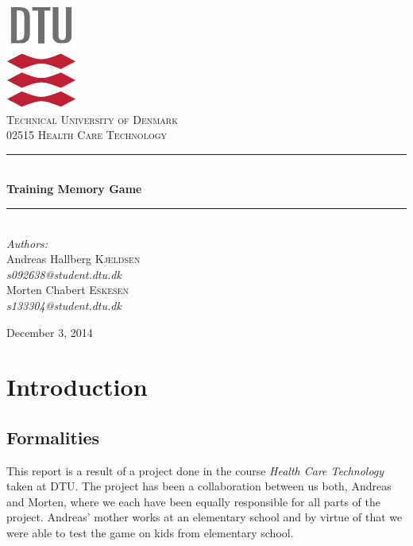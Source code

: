 \documentclass[11pt]{report}
\newcommand{\HRule}{\rule{\linewidth}{0.5mm}}
\begin{document}
\begin{titlepage}
\begin{center}

\includegraphics[scale=2.0]{../GFX/dtu_logo.pdf}\\[1cm]

\textsc{\LARGE Technical University of Denmark}\\[1.5cm]

\textsc{\Large 02515 Health Care Technology}\\[0.5cm]


\HRule \\[0.4cm]
{\huge \bfseries Training Memory Game}\\[0.1cm]
\HRule \\[1.5cm]

\large
\emph{Authors:}
\\[10pt]
Andreas Hallberg \textsc{Kjeldsen}\\
\emph{s092638@student.dtu.dk}
\\[10pt]
Morten Chabert \textsc{Eskesen}\\
\emph{s133304@student.dtu.dk}

\vfill

{\large December 3, 2014}

\end{center}
\end{titlepage}

\begingroup
\tableofcontents
\let\clearpage\relax
\listoffigures
\let\clearpage\relax
\listoftables
\endgroup

\chapter{Introduction}
\section{Formalities}
This report is a result of a project done in the course \emph{Health Care Technology} taken at DTU. The project has been a collaboration between us both, Andreas and Morten, where we each have been equally responsible for all parts of the project. Andreas' mother works at an elementary school and by virtue of that we were able to test the game on kids from elementary school.
\end{document}
